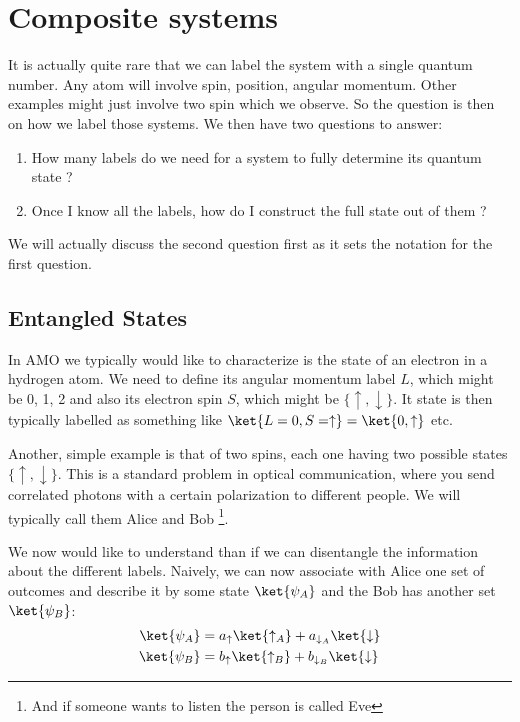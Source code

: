 \section{Composite systems}
It is actually quite rare that we can label the system with a single quantum number. Any atom will involve spin, position, angular momentum. Other examples might just involve two spin which we observe. So the question is then on how we label those systems. We then have two questions to answer:
\begin{enumerate}
\item How many labels do we need for a system to fully determine its quantum state ?
\item Once I know all the labels, how do I construct the full state out of them ?
\end{enumerate}
We will actually discuss the second question first as it sets the notation for the first question.



\subsection{Entangled States}
 
In AMO we typically would like to characterize is the state of an electron in a hydrogen atom. We need to define its angular momentum label $L$, which might be 0, 1, 2 and also its electron spin $S$, which might be $\{\uparrow, \downarrow\}$. It state is then typically labelled as something like $\ket{L=0, S=\uparrow} = \ket{0,\uparrow}$ etc.

Another, simple example is that of two spins, each one having two possible states $\{\uparrow, \downarrow\}$. This is a standard problem in optical communication, where you send correlated photons with a certain polarization to different people. We will typically call them Alice and Bob \footnote{And if someone wants to listen the person is called Eve}.

We now  would like to understand than if we can disentangle the information about the different labels. Naively, we can now  associate with Alice one set of outcomes and describe it by some state $\ket{\psi_{A}}$ and the Bob has another set $\ket{\psi_{B}}$:
\begin{align}\label{Eq:Local}
	\ket{\psi_A}&= a_{\uparrow} \ket{\uparrow_A}+ a_{\downarrow_A} \ket{\downarrow}\\
	\ket{\psi_B}&= b_{\uparrow} \ket{\uparrow_B}+ b_{\downarrow_B} \ket{\downarrow}
\end{align}


